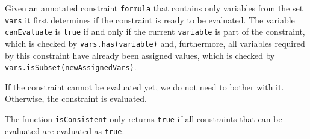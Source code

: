 \begin{enumerate}
\begin{enumerate}
        Given an annotated constraint \texttt{formula} that contains only variables from the set \texttt{vars}
        it first determines if the constraint is ready to be evaluated. The variable \texttt{canEvaluate} is
        \texttt{true} if and only if the current \texttt{variable} is part of the constraint, which is checked by
        \texttt{vars.has(variable)} and, furthermore, all variables required by this constraint have already been assigned
        values, which is checked by \texttt{vars.isSubset(newAssignedVars)}.

        If the constraint cannot be evaluated yet, we do not need to bother with it.
        Otherwise, the constraint is evaluated.

        The function \texttt{isConsistent} only returns \texttt{true} if all constraints that can be evaluated are evaluated
        as \texttt{true}.
  \end{enumerate}
\end{enumerate}      


